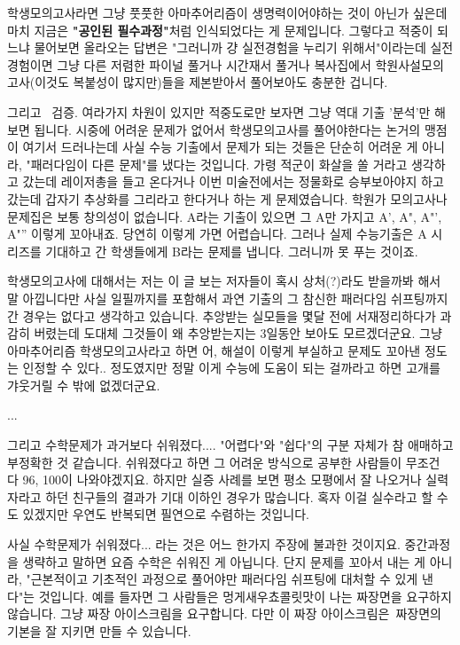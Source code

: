 학생모의고사라면 그냥 풋풋한 아마추어리즘이 생명력이어야하는 것이 아닌가 싶은데
마치 지금은 \textbf{"공인된 필수과정"}처럼 인식되었다는 게 문제입니다.
그렇다고 적중이 되느냐 물어보면 올라오는 답변은 "그러니까 걍 실전경험을 누리기 위해서"이라는데
실전경험이면 그냥 다른 저렴한 파이널 풀거나 시간재서 풀거나 복사집에서 학원사설모의고사(이것도 복붙성이 많지만)들을
제본받아서 풀어보아도 충분한 겁니다.
\vspace{5mm}

그리고  검증.
여라가지 차원이 있지만 적중도로만 보자면 그냥 역대 기출 '분석'만 해보면 됩니다.
시중에 어려운 문제가 없어서 학생모의고사를 풀어야한다는 논거의 맹점이 여기서 드러나는데
사실 수능 기출에서 문제가 되는 것들은 단순히 어려운 게 아니라, "패러다임이 다른 문제"를 냈다는 것입니다.
가령 적군이 화살을 쏠 거라고 생각하고 갔는데 레이저총을 들고 온다거나
이번 미술전에서는 정물화로 승부보아야지 하고 갔는데 갑자기 추상화를 그리라고 한다거나 하는 게 문제였습니다.
학원가 모의고사나 문제집은 보통 창의성이 없습니다.
A라는 기출이 있으면 그 A만 가지고 A', A", A"', A"'' 이렇게 꼬아내죠. 당연히 이렇게 가면 어렵습니다.
그러나 실제 수능기출은 A 시리즈를 기대하고 간 학생들에게 B라는 문제를 냅니다. 그러니까 못 푸는 것이죠.
\vspace{5mm}

학생모의고사에 대해서는 저는 이 글 보는 저자들이 혹시 상처(?)라도 받을까봐 해서 말 아낍니다만
사실 일필까지를 포함해서 과연 기출의 그 참신한 패러다임 쉬프팅까지 간 경우는 없다고 생각하고 있습니다.
추앙받는 실모들을 몇달 전에 서재정리하다가 과감히 버렸는데 도대체 그것들이 왜 추앙받는지는 3일동안 보아도 모르겠더군요.
그냥 아마추어리즘 학생모의고사라고 하면 어, 해설이 이렇게 부실하고 문제도 꼬아낸 정도는 인정할 수 있다.. 정도였지만
정말 이게 수능에 도움이 되는 걸까라고 하면 고개를 갸웃거릴 수 밖에 없겠더군요.
\vspace{5mm}

...
\vspace{5mm}

그리고 수학문제가 과거보다 쉬워졌다....
"어렵다"와 "쉽다"의 구분 자체가 참 애매하고 부정확한 것 같습니다.
쉬워졌다고 하면 그 어려운 방식으로 공부한 사람들이 무조건 다 96, 100이 나와야겠지요.
하지만 실증 사례를 보면 평소 모평에서 잘 나오거나 실력자라고 하던 친구들의 결과가 기대 이하인 경우가 많습니다.
혹자 이걸 실수라고 할 수도 있겠지만 우연도 반복되면 필연으로 수렴하는 것입니다.
\vspace{5mm}

사실 수학문제가 쉬워졌다... 라는 것은 어느 한가지 주장에 불과한 것이지요.
중간과정을 생략하고 말하면 요즘 수학은 쉬워진 게 아닙니다.
단지 문제를 꼬아서 내는 게 아니라, "근본적이고 기초적인 과정으로 풀어야만 패러다임 쉬프팅에 대처할 수 있게 낸다"는 것입니다.
예를 들자면 그 사람들은 멍게새우쵸콜릿맛이 나는 짜장면을 요구하지 않습니다.
그냥 짜장 아이스크림을 요구합니다. 다만 이 짜장 아이스크림은 짜장면의 기본을 잘 지키면 만들 수 있습니다.
\vspace{5mm}

